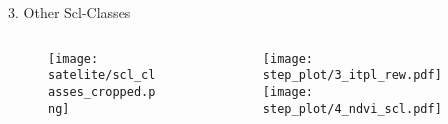 \begin{frame}[t]{3. Other Scl-Classes}
    \begin{columns}
        \begin{column}{0.45\textwidth}
            \begin{figure}
                \texttt{[image: satelite/scl\_classes\_cropped.png]}
            \end{figure}
        \end{column}
        \begin{column}{0.45\textwidth}
            \begin{figure}
                \vspace{-1.6cm}
                \texttt{[image: step\_plot/3\_itpl\_rew.pdf]}
                \texttt{[image: step\_plot/4\_ndvi\_scl.pdf]}
            \end{figure}
        \end{column}
    \end{columns}
\end{frame}

